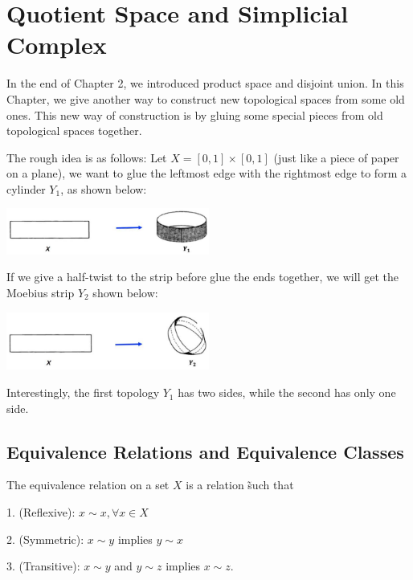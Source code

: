 \chapter{Quotient Space and Simplicial Complex}

In the end of Chapter 2, we introduced product space and disjoint union. In this Chapter, we give another way to construct new topological spaces from some old ones. This new way of construction is by gluing some special pieces from old topological spaces together.

The rough idea is as follows: Let \(X = \left\lbrack  {0,1}\right\rbrack   \times  \left\lbrack  {0,1}\right\rbrack\) (just like a piece of paper on a plane), we want to glue the leftmost edge with the rightmost edge to form a cylinder \({Y}_{1}\), as shown below:

\begin{center}
\includegraphics[width=0.5\textwidth]{images/Ch4_cylinder.jpg}
\end{center}
\hspace*{3em} 

If we give a half-twist to the strip before glue the ends together, we will get the Moebius strip \({Y}_{2}\) shown below:

\begin{center}
\includegraphics[width=0.5\textwidth]{images/Ch4_mobius1.jpg}
\end{center}
\hspace*{3em} 

Interestingly, the first topology \({Y}_{1}\) has two sides, while the second has only one side.

\section{Equivalence Relations and Equivalence Classes}

\begin{definition} \label{def:equiv_relation} The equivalence relation on a set \(X\) is a relation \~ such that

1. (Reflexive): \(x \sim  x,\forall x \in  X\)

2. (Symmetric): \(x \sim  y\) implies \(y \sim  x\)

3. (Transitive): \(x \sim  y\) and \(y \sim  z\) implies \(x \sim  z\).
\end{definition}

